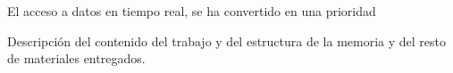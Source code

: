 
El acceso a datos en tiempo real, se ha convertido en una prioridad 

Descripción del contenido del trabajo y del estructura de la memoria y del resto de materiales entregados.

